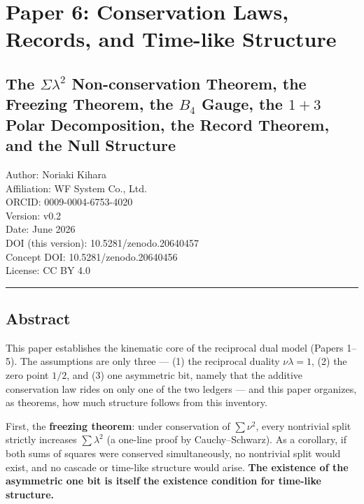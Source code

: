 \documentclass[
]{article}
\author{}
\date{}
\begin{document}
\section{Paper 6: Conservation Laws, Records, and Time-like
Structure}\label{paper-6-conservation-laws-records-and-time-like-structure}

\subsection{\texorpdfstring{The \(\Sigma\lambda^2\) Non-conservation
Theorem, the Freezing Theorem, the \(B_4\) Gauge, the \(1{+}3\) Polar
Decomposition, the Record Theorem, and the Null
Structure}{The \textbackslash Sigma\textbackslash lambda\^{}2 Non-conservation Theorem, the Freezing Theorem, the B\_4 Gauge, the 1\{+\}3 Polar Decomposition, the Record Theorem, and the Null Structure}}\label{the-sigmalambda2-non-conservation-theorem-the-freezing-theorem-the-b_4-gauge-the-13-polar-decomposition-the-record-theorem-and-the-null-structure}

Author: Noriaki Kihara\\
Affiliation: WF System Co., Ltd.\\
ORCID: 0009-0004-6753-4020\\
Version: v0.2\\
Date: June 2026\\
DOI (this version): 10.5281/zenodo.20640457\\
Concept DOI: 10.5281/zenodo.20640456\\
License: CC BY 4.0

\begin{center}\rule{0.5\linewidth}{0.5pt}\end{center}

\subsection{Abstract}\label{abstract}

This paper establishes the kinematic core of the reciprocal dual model
(Papers 1--5). The assumptions are only three --- (1) the reciprocal
duality \(\nu\lambda=1\), (2) the zero point \(1/2\), and (3) one
asymmetric bit, namely that the additive conservation law rides on only
one of the two ledgers --- and this paper organizes, as theorems, how
much structure follows from this inventory.

First, the \textbf{freezing theorem}: under conservation of
\(\sum\nu^2\), every nontrivial split strictly increases
\(\sum\lambda^2\) (a one-line proof by Cauchy--Schwarz). As a corollary,
if both sums of squares were conserved simultaneously, no nontrivial
split would exist, and no cascade or time-like structure would arise.
\textbf{The existence of the asymmetric one bit is itself the existence
condition for time-like structure.}
\end{document}
